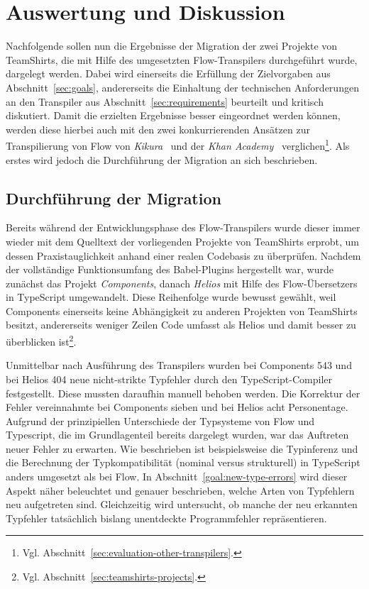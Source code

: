 \chapter{Auswertung und Diskussion}
\label{chap:evaluation}

Nachfolgende sollen nun die Ergebnisse der Migration der zwei Projekte von TeamShirts, die mit Hilfe des umgesetzten Flow-Transpilers durchgeführt wurde, dargelegt werden. Dabei wird einerseits die Erfüllung der Zielvorgaben aus Abschnitt~\ref{sec:goals}, andererseits die Einhaltung der technischen Anforderungen an den Transpiler aus Abschnitt~\ref{sec:requirements} beurteilt und kritisch diskutiert. Damit die erzielten Ergebnisse besser eingeordnet werden können, werden diese hierbei auch mit den zwei konkurrierenden Ansätzen zur Transpilierung von Flow von \textit{Kikura}~\autocite{KIKURA:FLOW_TO_TS} und der \textit{Khan Academy}~\autocite{KHAN:FLOW_TO_TS} verglichen\footnote{Vgl. Abschnitt~\ref{sec:evaluation-other-transpilers}.}. Als erstes wird jedoch die Durchführung der Migration an sich beschrieben.

\section{Durchführung der Migration}

Bereits während der Entwicklungsphase des Flow-Transpilers wurde dieser immer wieder mit dem Quelltext der vorliegenden Projekte von TeamShirts erprobt, um dessen Praxistauglichkeit anhand einer realen Codebasis zu überprüfen. Nachdem der vollständige Funktionsumfang des Babel-Plugins hergestellt war, wurde zunächst das Projekt \textit{Components}, danach \textit{Helios} mit Hilfe des Flow-Übersetzers in TypeScript umgewandelt. Diese Reihenfolge wurde bewusst gewählt, weil Components einerseits keine Abhängigkeit zu anderen Projekten von TeamShirts besitzt, andererseits weniger Zeilen Code umfasst als Helios und damit besser zu überblicken ist\footnote{Vgl. Abschnitt~\ref{sec:teamshirts-projects}.}.

Unmittelbar nach Ausführung des Transpilers wurden bei Components 543 und bei Helios 404 neue nicht-strikte Typfehler durch den TypeScript-Compiler festgestellt. Diese mussten daraufhin manuell behoben werden. Die Korrektur der Fehler vereinnahmte bei Components sieben und bei Helios acht Personentage. Aufgrund der prinzipiellen Unterschiede der Typsysteme von Flow und Typescript, die im Grundlagenteil bereits dargelegt wurden, war das Auftreten neuer Fehler zu erwarten. Wie beschrieben ist beispielsweise die Typinferenz und die Berechnung der Typkompatibilität (nominal versus strukturell) in TypeScript anders umgesetzt als bei Flow. In Abschnitt~\ref{goal:new-type-errors} wird dieser Aspekt näher beleuchtet und genauer beschrieben, welche Arten von Typfehlern neu aufgetreten sind. Gleichzeitig wird untersucht, ob manche der neu erkannten Typfehler tatsächlich bislang unentdeckte Programmfehler repräsentieren.

